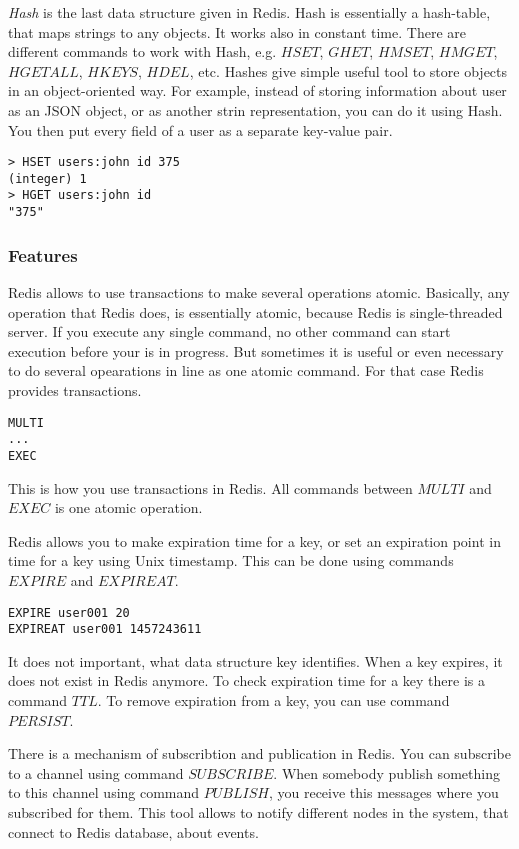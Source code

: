 \textit{Hash} is the last data structure given in Redis.
Hash is essentially a hash-table, that maps strings to any objects.
It works also in constant time.
There are different commands to work with Hash, e.g. $HSET$, $GHET$, $HMSET$, $HMGET$, $HGETALL$, $HKEYS$, $HDEL$, etc.
Hashes give simple useful tool to store objects in an object-oriented way.
For example, instead of storing information about user as an JSON object, or as another strin representation, you can do it using Hash.
You then put every field of a user as a separate key-value pair.
\begin{verbatim}
> HSET users:john id 375
(integer) 1
> HGET users:john id
"375"
\end{verbatim}

\subsubsection{Features}

Redis allows to use transactions to make several operations atomic.
Basically, any operation that Redis does, is essentially atomic, because Redis is single-threaded server.
If you execute any single command, no other command can start execution before your is in progress.
But sometimes it is useful or even necessary to do several opearations in line as one atomic command.
For that case Redis provides transactions.
\begin{verbatim}
MULTI
...
EXEC
\end{verbatim}
This is how you use transactions in Redis.
All commands between $MULTI$ and $EXEC$ is one atomic operation.

Redis allows you to make expiration time for a key, or set an expiration point in time for a key using Unix timestamp.
This can be done using commands $EXPIRE$ and $EXPIREAT$.
\begin{verbatim}
EXPIRE user001 20
EXPIREAT user001 1457243611
\end{verbatim}
It does not important, what data structure key identifies.
When a key expires, it does not exist in Redis anymore.
To check expiration time for a key there is a command $TTL$.
To remove expiration from a key, you can use command $PERSIST$.

There is a mechanism of subscribtion and publication in Redis.
You can subscribe to a channel using command $SUBSCRIBE$.
When somebody publish something to this channel using command $PUBLISH$, you receive this messages where you subscribed for them.
This tool allows to notify different nodes in the system, that connect to Redis database, about events.

